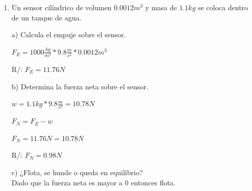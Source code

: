 \documentclass[a4paper, 11pt]{article}
\newcommand{\Pspace}{0.5cm}
\newcommand{\Aspace}{0.2cm}
\begin{document}
\begin{enumerate}
            \vspace{\Aspace} \par
            b) ¿En cuál es mayor el empuje y por qué?
            \\ { \color{azul} 
                R/: Dado que el agua tiene mayor densidad el empuje es mayor.
            }



        \vspace{\Pspace}
        \item Un sensor cilíndrico de volumen $0.0012m^3$ y masa de $1.1kg$ se coloca dentro de un tanque de agua.\par
            \vspace{\Aspace} \par
            a) Calcula el empuje sobre el sensor.
            \\ { \color{azul} 
                $F_{E} = 1000 \frac{kg}{m^3} * 9.8\frac{m}{s^2} * 0.0012m^3$
                \par R/: $F_{E} = 11.76N$
            }

            \vspace{\Aspace} \par
            b) Determina la fuerza neta sobre el sensor.
            \\ { \color{azul} 
                $w = 1.1kg * 9.8\frac{m}{s^2} = 10.78N$
                \par $F_{N} = F_{E} - w$
                \par $F_{N} = 11.76N = 10.78N$
                \par R/: $F_{N} = 0.98N$
            }

            \vspace{\Aspace} \par
            c) ¿Flota, se hunde o queda en equilibrio?
            \\ { \color{azul} Dado que la fuerza neta es mayor a 0 entonces flota. }
    \end{enumerate}
\end{document}
